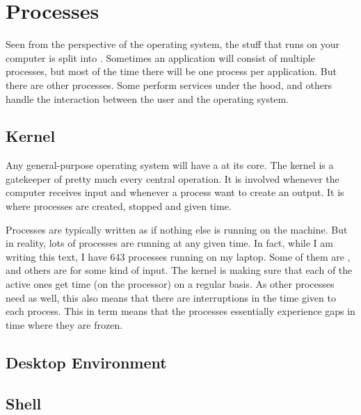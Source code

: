 \section{Processes}

Seen from the perspective of the operating system, the stuff that runs on your computer is split into . Sometimes an application will consist of multiple processes, but most of the time there will be one process per application. But there are other processes. Some perform services under the hood, and others handle the interaction between the user and the operating system.

\subsection{Kernel}

Any general-purpose operating system will have a  at its core. The kernel is a gatekeeper of pretty much every central operation. It is involved whenever the computer receives input and whenever a process want to create an output. It is where processes are created, stopped and given time.

Processes are typically written as if nothing else is running on the machine. But in reality, lots of processes are running at any given time. In fact, while I am writing this text, I have 643 processes running on my laptop. Some of them are , and others are  for some kind of input. The kernel is making sure that each of the active ones get time (on the processor) on a regular basis. As other processes need  as well, this also means that there are interruptions in the time given to each process. This in term means that the processes essentially experience gaps in time where they are frozen.

\subsection{Desktop Environment}



\subsection{Shell}

